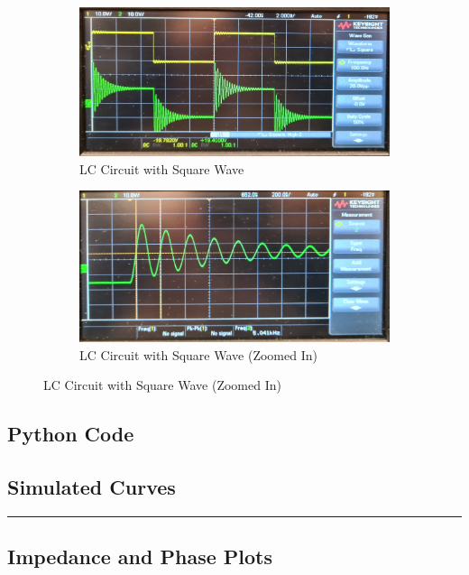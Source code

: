 \documentclass[a4paper,12pt]{article}
\begin{document}
\begin{figure}[H]
  \centering
  \begin{subfigure}{.5\textwidth}
    \centering
    \includegraphics[width=.9\linewidth]{../data/20211116_110612-mod.jpg}
    \caption{LC Circuit with Square Wave}
  \end{subfigure}%
  \begin{subfigure}{.5\textwidth}
    \centering
    \includegraphics[width=.9\linewidth]{../data/20211116_110834-mod.jpg}
    \caption{LC Circuit with Square Wave (Zoomed In)}
  \end{subfigure}
\end{figure}

\pagebreak

\subsection{Python Code}

\subsection{Simulated Curves}


\noindent\rule{\textwidth}{1pt}

\pagebreak

\subsection{Impedance and Phase Plots}
\end{document}
